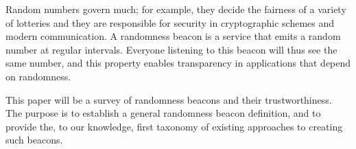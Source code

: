 Random numbers govern much; for example, they decide the fairness of a variety of lotteries and they are responsible for security in cryptographic schemes and modern communication. A randomness beacon is a service that emits a random number at regular intervals. Everyone listening to this beacon will thus see the same number, and this property enables transparency in applications that depend on randomness.%

This paper will be a survey of randomness beacons and their trustworthiness. The purpose is to establish a general randomness beacon definition, and to provide the, to our knowledge, first taxonomy of existing approaches to creating such beacons.

